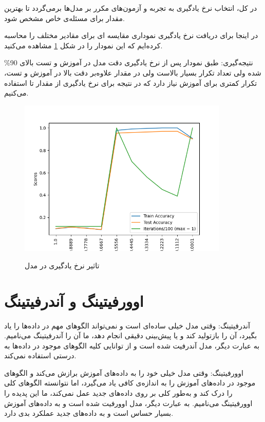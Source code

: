 \documentclass[12pt, dvipsnames, svgnames, x11names,]{article}
\begin{document}
			در کل، انتخاب نرخ یادگیری به تجربه و آزمون‌های مکرر بر مدل‌ها برمی‌گردد تا بهترین مقدار برای مسئله‌ی خاص مشخص شود.
			
			در اینجا برای دریافت نرخ یادگیری نموداری مقایسه ای برای مقادیر مختلف را محاسبه کرده‌ایم که این نمودار را در شکل \ref{fig:learning} مشاهده می‌کنید.
			
			نتیجه‌گیری: طبق نمودار پس از نرخ یادگیری  دقت مدل در آموزش و تست بالای 90\% شده ولی تعداد تکرار بسیار بالاست ولی در مقدار  علاوه‌بر دقت بالا در آموزش و تست،‌ تکرار کمتری برای آموزش نیاز دارد که در نتیجه برای نرخ یادگیری از مقدار  تا  استفاده می‌کنیم.
			
	
		\begin{figure}
			\begin{center}
				{\includegraphics[width=10cm]{images/09.png}}
			\end{center}
			\caption{تاثیر نرخ یادگیری در مدل}
			\label{fig:learning}
		\end{figure}
		
		
	\section{اوورفیتینگ و آندرفیتینگ}
		آندرفیتینگ:
		وقتی مدل خیلی ساده‌ای است و نمی‌تواند الگوهای مهم در داده‌ها را یاد بگیرد، آن را بازتولید کند و یا پیش‌بینی دقیقی انجام دهد، ما آن را آندرفیتینگ می‌نامیم. به عبارت دیگر، مدل آندرفیت شده است و از توانایی کلیه الگوهای موجود در داده‌ها به درستی استفاده نمی‌کند.
		
		اوورفیتینگ:
		وقتی مدل خیلی خود را به داده‌های آموزش برازش می‌کند و الگوهای موجود در داده‌های آموزش را به اندازه‌ی کافی یاد می‌گیرد، اما نتوانسته الگوهای کلی را درک کند و به‌طور کلی بر روی داده‌های جدید عمل نمی‌کند، ما این پدیده را اوورفیتینگ می‌نامیم. به عبارت دیگر، مدل اوورفیت شده است و به داده‌های آموزش بسیار حساس است و به داده‌های جدید عملکرد بدی دارد.
		
\end{document}
